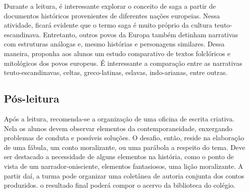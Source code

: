 \documentclass[12pt]{extarticle}
\begin{document}
Durante a leitura, é interessante explorar o conceito de saga a
partir de documentos históricos provenientes de diferentes nações
europeias. Nessa atividade, ficará evidente que o termo saga é muito
próprio da cultura teuto-escandinava. Entretanto, outros povos da Europa
também detinham narrativas com estruturas análogas e, mesmo histórias e
personagens similares. Dessa maneira, proponha aos alunos um estudo
comparativo de textos folclóricos e mitológicos dos povos europeus. É
interessante a comparação entre as narrativas teuto-escandinavas,
celtas, greco-latinas, eslavas, indo-arianas, entre outras.

\subsection{Pós-leitura}



Após a leitura, recomenda-se a organização de uma oficina de
escrita criativa. Nela os alunos devem observar elementos da
contemporaneidade, enxergando problemas de conduta e possíveis soluções.
O desafio, então, reside na elaboração de uma fábula, um conto
moralizante, ou uma parábola a respeito do tema. Deve ser destacado a
necessidade de alguns elementos na história, como o ponto de vista de um
narrador-onisciente, elementos fantasiosos, uma lição moralizante. A
partir daí, a turma pode organizar uma coletânea de autoria conjunta dos
contos produzidos. o resultado final poderá compor o acervo da
biblioteca do colégio.
\end{document}
